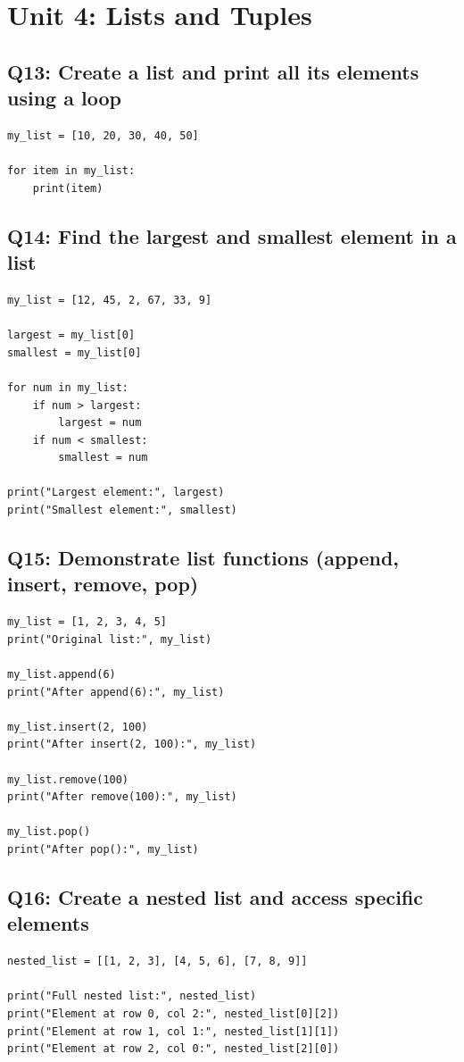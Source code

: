 \documentclass[11pt,a4paper]{article}
\begin{document}
\section{Unit 4: Lists and Tuples}

\subsection{Q13: Create a list and print all its elements using a loop}
\begin{lstlisting}
my_list = [10, 20, 30, 40, 50]

for item in my_list:
    print(item)
\end{lstlisting}

\subsection{Q14: Find the largest and smallest element in a list}
\begin{lstlisting}
my_list = [12, 45, 2, 67, 33, 9]

largest = my_list[0]
smallest = my_list[0]

for num in my_list:
    if num > largest:
        largest = num
    if num < smallest:
        smallest = num

print("Largest element:", largest)
print("Smallest element:", smallest)
\end{lstlisting}

\subsection{Q15: Demonstrate list functions (append, insert, remove, pop)}
\begin{lstlisting}
my_list = [1, 2, 3, 4, 5]
print("Original list:", my_list)

my_list.append(6)
print("After append(6):", my_list)

my_list.insert(2, 100)
print("After insert(2, 100):", my_list)

my_list.remove(100)
print("After remove(100):", my_list)

my_list.pop()
print("After pop():", my_list)
\end{lstlisting}

\subsection{Q16: Create a nested list and access specific elements}
\begin{lstlisting}
nested_list = [[1, 2, 3], [4, 5, 6], [7, 8, 9]]

print("Full nested list:", nested_list)
print("Element at row 0, col 2:", nested_list[0][2])
print("Element at row 1, col 1:", nested_list[1][1])
print("Element at row 2, col 0:", nested_list[2][0])
\end{lstlisting}
\end{document}
